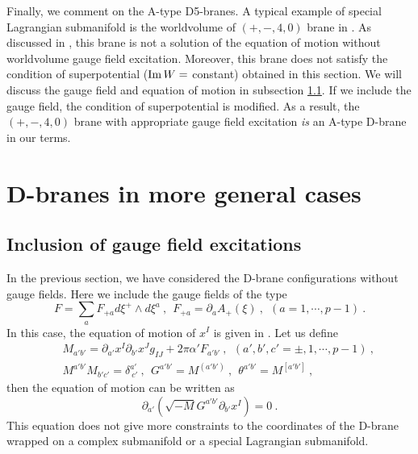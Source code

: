 \documentclass[a4paper,12pt]{article}
\numberwithin{equation}{section}
\DeclareMathOperator*{\im}{{\rm Im}}
\begin{document}
Finally, we comment on the A-type D5-branes. A typical example of
special Lagrangian submanifold 
is the worldvolume of $(+,-,4,0)$ brane in \cite{Skenderis:2002vf}.
As discussed in \cite{Skenderis:2002vf}, this brane is not a solution of
the equation of motion without worldvolume gauge field excitation.
Moreover, this brane does not satisfy the condition
of superpotential ($\im W=$ constant) obtained in this section. 
We will discuss the gauge field
and equation of motion in subsection \ref{subsec-gauge}. If we include
the gauge field, the condition of superpotential is modified.
As a result, the $(+,-,4,0)$ brane with appropriate gauge field
excitation {\em is} an A-type D-brane in our terms.


\section{D-branes in more general cases}
\label{section-general-backgrounds}

\subsection{Inclusion of gauge field excitations}
\label{subsec-gauge}

In the previous section, we have considered the D-brane configurations
without gauge fields. 
Here we include the gauge fields of the type
\begin{equation}
 F = \sum_{a} F_{+a} d \xi^+ \wedge d \xi^a ~,~~
 F_{+a} = \partial_a A_+ (\xi) ~, ~~ (a=1,\cdots,p-1) ~.
\end{equation}
In this case, the equation of motion of $x^{I}$ is given in 
\cite{Skenderis:2002vf}.
Let us define
\begin{eqnarray}
 &&M_{a'b'} = \partial_{a'} x^I \partial_{b'} x^J g_{IJ} 
               + 2 \pi \alpha'  F_{a'b'} ~,~~
 (a',b',c'=\pm,1,\cdots,p-1) ~, \nonumber \\
 &&M^{a'b'} M_{b'c'} = \delta^{a'}_{~c'} ~,~~
   G^{a'b'} = M^{(a'b')} ~,~~ \theta^{a'b'} = M^{[a'b']}~, 
\end{eqnarray} 
then the equation of motion can be written as
\begin{equation}
 \partial_{a'} (\sqrt{-M} G^{a'b'} \partial_{b'} x^I  ) = 0 ~.
\end{equation}
This equation does not give more constraints to the coordinates of the 
D-brane wrapped on a complex submanifold or a special Lagrangian
submanifold. 
\end{document}
